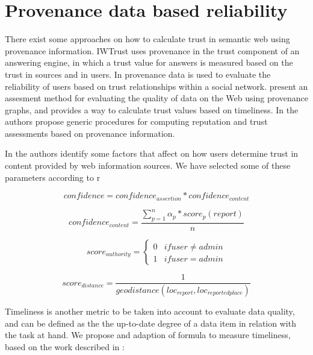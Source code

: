 \section{Provenance data based reliability}
\label{sec:provenance}

There exist some approaches on how to calculate trust in semantic web using provenance information. IWTrust \cite{zaihrayeu2005iwtrust} uses provenance in the trust component of an answering engine, in which a trust value for answers is measured based on the trust in sources and in users. In \cite{golbeck2006combining} provenance data is used to evaluate the reliability of users based on trust relationships within a social network. \cite{Hartig09usingweb} present an assesment method for evaluating the quality of data on the Web using provenance graphs, and provides a way to calculate trust values based on timeliness. In \cite{CeolinGHNF12} the authors propose generic procedures for computing reputation and trust assessments based on provenance information.

In \cite{gil2007towards} the authors identify some factors that affect on how users determine trust in content provided by web information sources. We have selected some of these parameters according to r


\begin{equation}
confidence = confidence_{assertion} * confidence_{content}
\end{equation}

\begin{equation}
confidence_{content} = \frac{\sum_{p=1}^{n} \alpha_p * score_p(report)}{n}
\end{equation}

\begin{equation}
score_{authority} = \left\{\begin{matrix}
0 & if user \neq admin \\
1 & if user = admin
\end{matrix}\right.
\end{equation}

\begin{equation}
score_{distance} = \frac{1}{geodistance(loc_{report}, loc_{reportedplace})}
\end{equation}


Timeliness is another metric to be taken into account to evaluate data quality, and can be defined as the the up-to-date degree of a data item in relation with the task at hand. We propose and adaption of \cite{Hartig09usingweb} formula to measure timeliness, based on the work described in \cite{Ballou:1998:MIM:291329.291335}:


